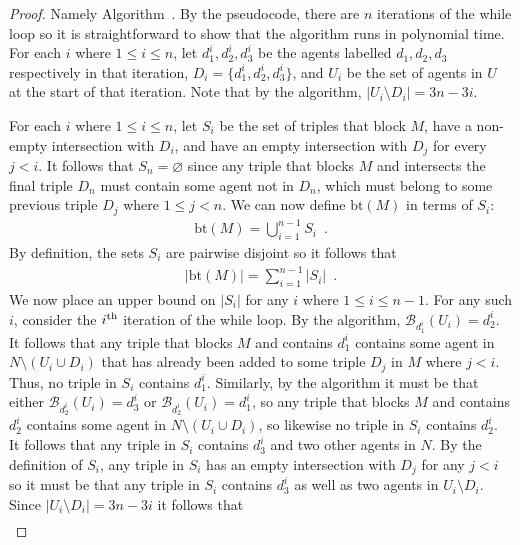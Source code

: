 \begin{proof}
Namely Algorithm~. By the pseudocode, there are $n$ iterations of the while loop so it is straightforward to show that the algorithm runs in polynomial time. For each $i$ where $1\leq i \leq n$, let $d_1^i, d_2^i, d_3^i$ be the agents labelled $d_1, d_2, d_3$ respectively in that iteration, $D_i = \{ d_1^i, d_2^i, d_3^i \}$, and $U_i$ be the set of agents in $U$ at the start of that iteration. Note that by the algorithm, $|U_i \setminus D_i| = 3n - 3i$.

For each $i$ where $1\leq i \leq n$, let $S_i$ be the set of triples that block $M$, have a non-empty intersection with $D_i$, and have an empty intersection with $D_j$ for every $j < i$. It follows that $S_n = \varnothing$ since any triple that blocks $M$ and intersects the final triple $D_n$ must contain some agent not in $D_n$, which must belong to some previous triple $D_j$ where $1 \leq j < n$. We can now define $\textrm{bt}(M)$ in terms of $S_i$:
\begin{align*}
    \text{bt}(M) = \bigcup\limits_{i=1}^{n - 1} S_i\enspace.
\end{align*}
By definition, the sets $S_i$ are pairwise disjoint so it follows that
\begin{align}
    |\text{bt}(M)| = \sum\limits_{i=1}^{n - 1} |S_i|\enspace. \label{eqn:threed_sr_b_instab_as_si}
\end{align}
We now place an upper bound on $|S_i|$ for any $i$ where $1\leq i \leq n - 1$. For any such $i$, consider the $i\textsuperscript{th}$ iteration of the while loop. By the algorithm, $\mathscr{B}_{d_1^i}(U_i) = d_2^i$. It follows that any triple that blocks $M$ and contains $d_1^i$ contains some agent in $N \setminus (U_i \cup D_i)$ that has already been added to some triple $D_j$ in $M$ where $j < i$. Thus, no triple in $S_i$ contains $d_1^i$. Similarly, by the algorithm it must be that either $\mathscr{B}_{d_2^i}(U_i) = d_3^i$ or $\mathscr{B}_{d_2^i}(U_i) = d_1^i$, so any triple that blocks $M$ and contains $d_2^i$ contains some agent in $N \setminus (U_i \cup D_i)$, so likewise no triple in $S_i$ contains $d_2^i$. It follows that any triple in $S_i$ contains $d_3^i$ and two other agents in $N$. By the definition of $S_i$, any triple in $S_i$ has an empty intersection with $D_j$ for any $j < i$ so it must be that any triple in $S_i$ contains $d_3^i$ as well as two agents in $U_i \setminus D_i$. Since $|U_i \setminus D_i| = 3n - 3i$ it follows that
\begin{align}

\end{align}
\end{proof}
